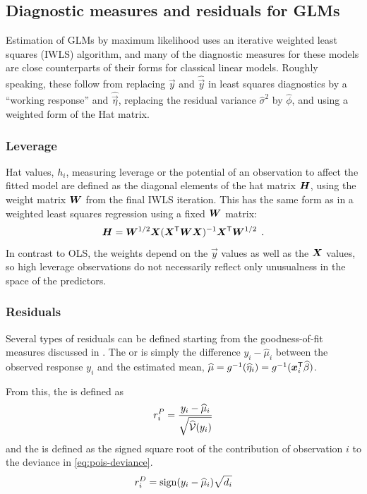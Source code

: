 \documentclass[11pt]{book}\usepackage[]{graphicx}\usepackage[]{color}
\begin{document}
\subsection{Diagnostic measures and residuals for GLMs}

Estimation of GLMs by maximum likelihood uses an iterative weighted least squares (IWLS) algorithm,
and many of the diagnostic measures for these models are close counterparts of their forms for
classical linear models.  Roughly speaking, these follow from replacing
$\vec{y}$ and $\widehat{\vec{y}}$ in least squares diagnostics by a ``working response'' and
$\widehat{\vec{\eta}}$, replacing the residual variance $\widehat{\sigma}^2$ by $\widehat{\phi}$,
and using a weighted form of the Hat matrix.

\subsubsection{Leverage}
Hat values, $h_i$, measuring leverage or the potential of an observation to affect the fitted model
are defined as the diagonal elements of the hat matrix $\bm{H}$, using the weight matrix
$\bm{W}$ from the final IWLS iteration.  This has the same form as in a weighted least squares
regression using a fixed $\bm{W}$ matrix:
\begin{equation*}
\bm{H} = \bm{W}^{1/2} \bm{X} (\bm{X}^\mathsf{T} \bm{W}  \bm{X} )^{-1} \bm{X}^\mathsf{T} \bm{W}^{1/2} \:\: .
\end{equation*}
In contrast to OLS, the weights depend on the $\vec{y}$ values as well as the $\bm{X}$ values, so
high leverage observations do not necessarily reflect only unusualness in the space of the
predictors.

\subsubsection{Residuals}

Several types of residuals can be defined starting from the goodness-of-fit measures
discussed in .
The  or  is simply the difference $y_i - \widehat{\mu}_i$
between the observed response $y_i$ and the estimated mean,
$\widehat{\mu} = g^{-1} (\widehat{\eta}_i) = g^{-1} (\bm{x}_i^\mathsf{T} \widehat{\beta})$.

From this, the  is defined as
\begin{equation}\label{eq:res-pearson}
r^P_i = \frac{y_i - \widehat{\mu}_i} {\sqrt{\widehat{\mathcal{V}}(y_i)}}
\end{equation}
and the  is defined as the signed square root of the contribution of observation $i$ to the
deviance in \eqref{eq:pois-deviance}.
\begin{equation}\label{eq:res-deviance}
r^D_i = \sign (y_i - \widehat{\mu}_i) \sqrt {d_i}
\end{equation}
\end{document}
